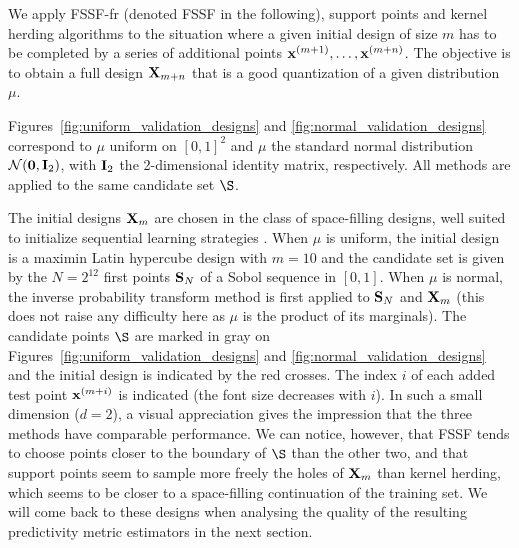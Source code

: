 We apply FSSF-fr (denoted FSSF in the following), support points and kernel herding algorithms to the situation where a given initial design of size $m$ has to be completed by a series of additional points ${\bf x}^{(m+1)},\ldots,{\bf x}^{(m+n)}$. The objective is to obtain a full design ${\bf X}_{m+n}$ that is a good quantization of a given distribution $\mu$. 

Figures~\ref{fig:uniform_validation_designs} and \ref{fig:normal_validation_designs}  correspond to $\mu$ uniform on $[0,1]^2$ and $\mu$ the standard normal distribution $\SN(\0b,\Ib_2)$, with $\mathbf{I}_2$ the 2-dimensional identity matrix, respectively. All methods  are applied to the same candidate set $\S$. 

The initial designs ${\bf X}_m$ are chosen in the class of space-filling designs, well suited to initialize sequential learning strategies \cite{sanwil03}.
When $\mu$ is uniform, the initial design is a maximin Latin hypercube design \cite{mormit95} with $m=10$ and the candidate set is given by the $N=2^{12}$ first points $\mathbf{S}_N$ of a Sobol sequence in $[0,1]$. When $\mu$ is normal, the inverse probability transform method is first applied to $\mathbf{S}_N$ and ${\bf X}_m$ (this does not raise any difficulty here as $\mu$ 
is the product of its marginals).
The candidate points $\S$ are marked in gray on Figures~\ref{fig:uniform_validation_designs} and \ref{fig:normal_validation_designs} and the initial design is indicated by the red crosses. The index $i$ of each  added test point ${\bf x}^{(m+i)}$ is indicated (the font size decreases with $i$). In such a small dimension ($d=2$), a visual appreciation gives the impression that the three methods have comparable performance. 
We can notice, however, that FSSF tends to choose points closer to the boundary of $\S$ than the other two, and that  support points seem to sample more freely the holes of ${\bf X}_m$ than kernel herding, which seems to be closer to a space-filling continuation of the training set.
We will come back to these designs when analysing the  quality of the resulting predictivity metric estimators in the next section.


